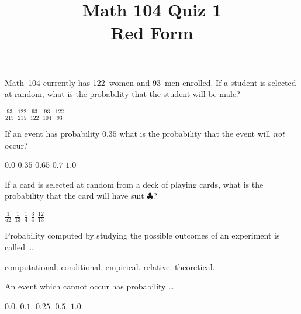 \documentclass[12pt]{exam}
\title{Math 104 Quiz 1\\Red Form}
\begin{document}
\maketitle
\begin{center}
\end{center}

\begin{questions}
\question Math~104 currently has 122~women and 93~men enrolled.
If a student is selected at random, what is the probability
that the student will be male?\\
\begin{oneparchoices}
\choice $\frac{93}{215}$
\choice $\frac{122}{215}$
\choice $\frac{93}{122}$
\choice $\frac{93}{104}$
\choice $\frac{122}{93}$
\end{oneparchoices}

\question If an event has probability $0.35$
what is the probability that the event will {\em not} occur?\\
\begin{oneparchoices}
\choice $0.0$
\choice $0.35$
\choice $0.65$
\choice $0.7$
\choice $1.0$
\end{oneparchoices}

\question If a card is selected at random from a deck of
playing cards, what is the probability that
the card will have suit $\clubsuit$?\\
\begin{oneparchoices}
\choice $\frac{1}{52}$
\choice $\frac{1}{13}$
\choice $\frac{1}{4}$
\choice $\frac{3}{4}$
\choice $\frac{12}{13}$
\end{oneparchoices}

\question Probability computed by studying
the possible outcomes of an experiment is called \dots\\
\begin{oneparchoices}
\choice computational.
\choice conditional.
\choice empirical.
\choice relative.
\choice theoretical.
\end{oneparchoices}

\question An event which cannot occur has probability \dots\\
\begin{oneparchoices}
\choice $0.0$.
\choice $0.1$.
\choice $0.25$.
\choice $0.5$.
\choice $1.0$.
\end{oneparchoices}


\end{questions}
\end{document}
